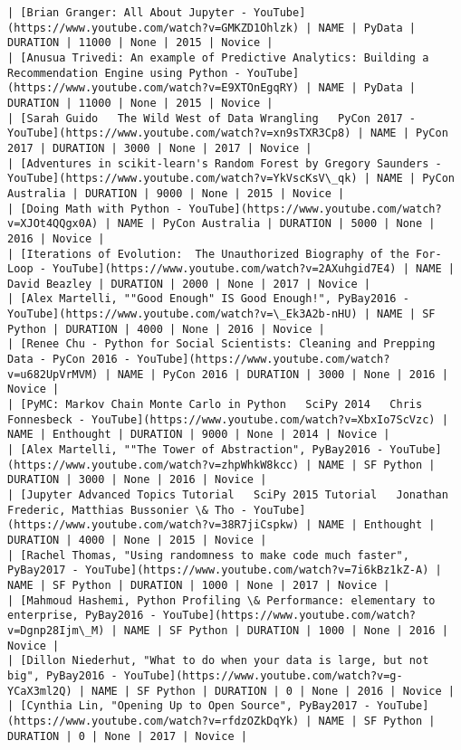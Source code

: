 \documentclass[11pt]{article}
\begin{document}
\begin{Verbatim}[commandchars=\\\{\}]
| [Brian Granger: All About Jupyter - YouTube](https://www.youtube.com/watch?v=GMKZD1Ohlzk) | NAME | PyData | DURATION | 11000 | None | 2015 | Novice |
| [Anusua Trivedi: An example of Predictive Analytics: Building a Recommendation Engine using Python - YouTube](https://www.youtube.com/watch?v=E9XTOnEgqRY) | NAME | PyData | DURATION | 11000 | None | 2015 | Novice |
| [Sarah Guido   The Wild West of Data Wrangling   PyCon 2017 - YouTube](https://www.youtube.com/watch?v=xn9sTXR3Cp8) | NAME | PyCon 2017 | DURATION | 3000 | None | 2017 | Novice |
| [Adventures in scikit-learn's Random Forest by Gregory Saunders - YouTube](https://www.youtube.com/watch?v=YkVscKsV\_qk) | NAME | PyCon Australia | DURATION | 9000 | None | 2015 | Novice |
| [Doing Math with Python - YouTube](https://www.youtube.com/watch?v=XJOt4QQgx0A) | NAME | PyCon Australia | DURATION | 5000 | None | 2016 | Novice |
| [Iterations of Evolution:  The Unauthorized Biography of the For-Loop - YouTube](https://www.youtube.com/watch?v=2AXuhgid7E4) | NAME | David Beazley | DURATION | 2000 | None | 2017 | Novice |
| [Alex Martelli, ""Good Enough" IS Good Enough!", PyBay2016 - YouTube](https://www.youtube.com/watch?v=\_Ek3A2b-nHU) | NAME | SF Python | DURATION | 4000 | None | 2016 | Novice |
| [Renee Chu - Python for Social Scientists: Cleaning and Prepping Data - PyCon 2016 - YouTube](https://www.youtube.com/watch?v=u682UpVrMVM) | NAME | PyCon 2016 | DURATION | 3000 | None | 2016 | Novice |
| [PyMC: Markov Chain Monte Carlo in Python   SciPy 2014   Chris Fonnesbeck - YouTube](https://www.youtube.com/watch?v=XbxIo7ScVzc) | NAME | Enthought | DURATION | 9000 | None | 2014 | Novice |
| [Alex Martelli, ""The Tower of Abstraction", PyBay2016 - YouTube](https://www.youtube.com/watch?v=zhpWhkW8kcc) | NAME | SF Python | DURATION | 3000 | None | 2016 | Novice |
| [Jupyter Advanced Topics Tutorial   SciPy 2015 Tutorial   Jonathan Frederic, Matthias Bussonier \& Tho - YouTube](https://www.youtube.com/watch?v=38R7jiCspkw) | NAME | Enthought | DURATION | 4000 | None | 2015 | Novice |
| [Rachel Thomas, "Using randomness to make code much faster", PyBay2017 - YouTube](https://www.youtube.com/watch?v=7i6kBz1kZ-A) | NAME | SF Python | DURATION | 1000 | None | 2017 | Novice |
| [Mahmoud Hashemi, Python Profiling \& Performance: elementary to enterprise, PyBay2016 - YouTube](https://www.youtube.com/watch?v=Dgnp28Ijm\_M) | NAME | SF Python | DURATION | 1000 | None | 2016 | Novice |
| [Dillon Niederhut, "What to do when your data is large, but not big", PyBay2016 - YouTube](https://www.youtube.com/watch?v=g-YCaX3ml2Q) | NAME | SF Python | DURATION | 0 | None | 2016 | Novice |
| [Cynthia Lin, "Opening Up to Open Source", PyBay2017 - YouTube](https://www.youtube.com/watch?v=rfdzOZkDqYk) | NAME | SF Python | DURATION | 0 | None | 2017 | Novice |

    \end{Verbatim}
\end{document}
